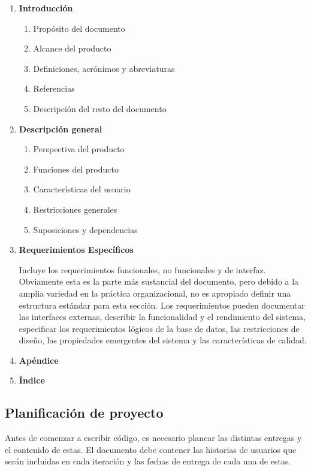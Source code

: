 \vspace{10mm}
\begin{framed}
     \begin{enumerate}
		\item \textbf{Introducción}
		\begin{enumerate}
			\item Propósito del documento
			\item Alcance del producto
			\item Definiciones, acrónimos y abreviaturas
			\item Referencias
			\item Descripción del resto del documento
		\end{enumerate}
		\item \textbf{Descripción general}
		\begin{enumerate}
			\item Perspectiva del producto
			\item Funciones del producto
			\item Características del usuario
			\item Restricciones generales
			\item Suposiciones y dependencias
		\end{enumerate}		
		\item \textbf{Requerimientos Específicos}

		Incluye los requerimientos funcionales, no funcionales y de interfaz. Obviamente esta es la parte más sustancial del documento, pero debido a la amplia variedad en la práctica organizacional, no es apropiado definir una estructura estándar para esta sección. Los requerimientos pueden documentar las interfaces externas, describir la funcionalidad y el rendimiento del sistema, especificar los requerimientos lógicos de la base de datos, las restricciones de diseño, las propiedades emergentes del sistema y las características de calidad.
		\item \textbf{Apéndice}
		\item \textbf{Índice}
	\end{enumerate}
\end{framed}

\subsection{Planificación de proyecto}
Antes de comenzar a escribir código, es necesario planear las distintas entregas y el contenido de estas. El documento debe contener las historias de usuarios que serán incluidas en cada iteración y las fechas de entrega de cada una de estas.

